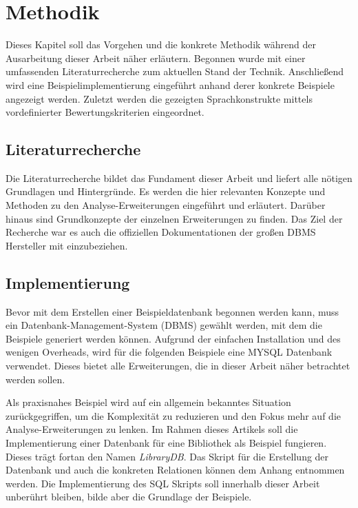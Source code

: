 \chapter{Methodik}
\label{chap:methodik} Dieses Kapitel soll das Vorgehen und die konkrete Methodik
während der Ausarbeitung dieser Arbeit näher erläutern. Begonnen wurde mit einer
umfassenden Literaturrecherche zum aktuellen Stand der Technik. Anschließend wird
eine Beispielimplementierung eingeführt anhand derer konkrete Beispiele angezeigt
werden. Zuletzt werden die gezeigten Sprachkonstrukte mittels vordefinierter
Bewertungskriterien eingeordnet.

\section{Literaturrecherche}
\label{sec:literaturrecherche} Die Literaturrecherche bildet das Fundament
dieser Arbeit und liefert alle nötigen Grundlagen und Hintergründe. Es werden die
hier relevanten Konzepte und Methoden zu den Analyse-Erweiterungen eingeführt und
erläutert. Darüber hinaus sind Grundkonzepte der einzelnen Erweiterungen zu
finden. Das Ziel der Recherche war es auch die offiziellen Dokumentationen der großen
DBMS Hersteller mit einzubeziehen.

\section{Implementierung}
\label{sec:implementierung} Bevor mit dem Erstellen einer Beispieldatenbank begonnen
werden kann, muss ein Datenbank-Management-System (DBMS) gewählt werden, mit dem
die Beispiele generiert werden können. Aufgrund der einfachen Installation und
des wenigen Overheads, wird für die folgenden Beispiele eine MYSQL Datenbank verwendet.
Dieses bietet alle Erweiterungen, die in dieser Arbeit näher betrachtet werden sollen.

Als praxisnahes Beispiel wird auf ein allgemein bekanntes Situation zurückgegriffen,
um die Komplexität zu reduzieren und den Fokus mehr auf die Analyse-Erweiterungen
zu lenken. Im Rahmen dieses Artikels soll die Implementierung einer Datenbank für
eine Bibliothek als Beispiel fungieren. Dieses trägt fortan den Namen \textit{LibraryDB}.
Das Skript für die Erstellung der Datenbank und auch die konkreten Relationen
können dem Anhang entnommen werden. Die Implementierung des SQL Skripts soll innerhalb
dieser Arbeit unberührt bleiben, bilde aber die Grundlage der Beispiele.


